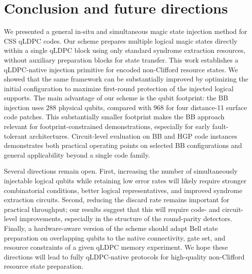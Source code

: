 \section{Conclusion and future directions}
\label{sec:conclusion}

We presented a general in-situ and simultaneous magic state injection method for CSS qLDPC codes. Our scheme prepares multiple logical magic states directly within a single qLDPC block using only standard syndrome extraction resources, without auxiliary preparation blocks for state transfer. This work establishes a qLDPC-native injection primitive for encoded non-Clifford resource states. We showed that the same framework can be substantially improved by optimizing the initial configuration to maximize first-round protection of the injected logical supports. The main advantage of our scheme is the qubit footprint: the BB injection uses 288 physical qubits, compared with 968 for four distance-11 surface code patches. This substantially smaller footprint makes the BB approach relevant for footprint-constrained demonstrations, especially for early fault-tolerant architectures. Circuit-level evaluation on BB and HGP code instances demonstrates both practical operating points on selected BB configurations and general applicability beyond a single code family. 

Several directions remain open. First, increasing the number of simultaneously injectable logical qubits while retaining low error rates will likely require stronger combinatorial conditions, better logical representatives, and improved syndrome extraction circuits. Second, reducing the discard rate remains important for practical throughput; our results suggest that this will require code- and circuit-level improvements, especially in the structure of the round-parity detectors. Finally, a hardware-aware version of the scheme should adapt Bell state preparation on overlapping qubits to the native connectivity, gate set, and resource constraints of a given qLDPC memory experiment. We hope these directions will lead to fully qLDPC-native protocols for high-quality non-Clifford resource state preparation.
